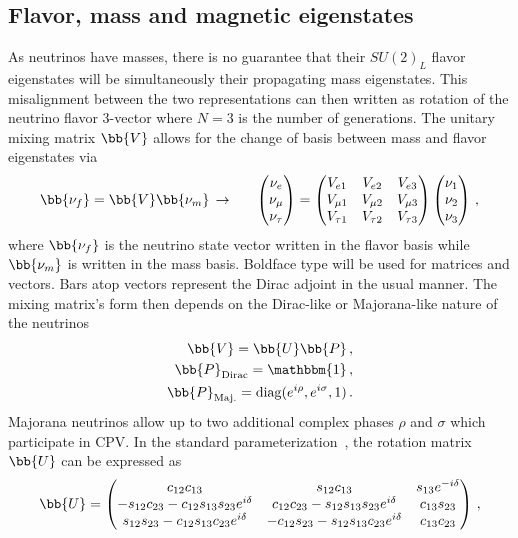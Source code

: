 \subsection{Flavor, mass and magnetic eigenstates}\label{sec:mix}
\noindent As neutrinos have masses, there is no guarantee that their $SU(2)_{L}$ flavor eigenstates will be simultaneously their propagating mass eigenstates. This misalignment between the two representations can then written as rotation of the neutrino flavor 3-vector where $N=3$ is the number of generations. The unitary mixing matrix $\bb{V}$ allows for the change of basis between mass and flavor eigenstates via
\begin{alignat}{1}
	\label{basis:1} \bb{\nu_{f}}=\bb{V}\bb{\nu_{m}}\,\rightarrow\indent
	\begin{pmatrix}
		\nu_{e}\\
		\nu_{\mu}\\
		\nu_{\tau}
	\end{pmatrix}=
	\begin{pmatrix}
		V_{e1} & V_{e2} & V_{e3}\\
		V_{\mu1} & V_{\mu2} & V_{\mu3}\\
		V_{\tau1} & V_{\tau2} & V_{\tau3}
	\end{pmatrix}
	\begin{pmatrix}
		\nu_{1}\\
		\nu_{2}\\
		\nu_{3}
	\end{pmatrix}\,,
\end{alignat}
where $\bb{\nu_{f}}$ is the neutrino state vector written in the flavor basis while $\bb{\nu_{m}}$ is written in the mass basis. Boldface type will be used for matrices and vectors. Bars atop vectors represent the Dirac adjoint in the usual manner. The mixing matrix's form then depends on the Dirac-like or Majorana-like nature of the neutrinos
\begin{align}
	\label{phases:1} \bb{V} = \bb{U}\bb{P}\,,\\
	\label{phases:2} \bb{P}_\mathrm{Dirac} = \mathbbm{1}\,,\\
	\label{phases:3} \bb{P}_\mathrm{Maj.} = \mathrm{diag}(e^{i\rho},e^{i\sigma},1)\,.
\end{align}
Majorana neutrinos allow up to two additional complex phases $\rho$ and $\sigma$ which participate in CPV. In the standard parameterization~\citep{Schwartz:2014sze}, the rotation matrix $\bb{U}$ can be expressed as
\begin{alignat}{1}
	\label{rotation:1} \bb{U} =
	  \begin{pmatrix}
		  c_{12}c_{13} & s_{12}c_{13} & s_{13}e^{-i\delta}\\
		  -s_{12}c_{23} - c_{12}s_{13}s_{23}e^{i\delta} & c_{12}c_{23} - s_{12}s_{13}s_{23}e^{i\delta} & c_{13}s_{23}\\
		  s_{12}s_{23} - c_{12}s_{13}c_{23}e^{i\delta}& -c_{12}s_{23} - s_{12}s_{13}c_{23}e^{i\delta} & c_{13}c_{23}
	  \end{pmatrix}\,,
\end{alignat}
